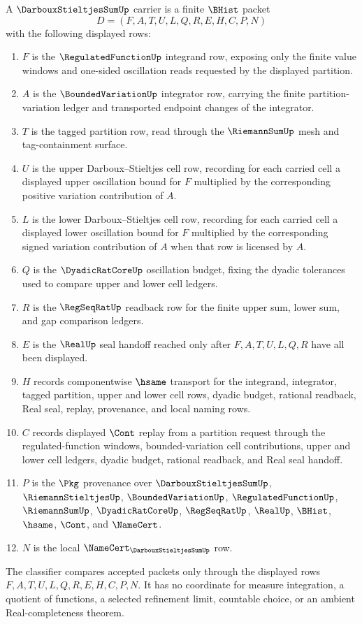 \begin{definition}
\label{def:darboux-stieltjes-sum-carrier}
A $\DarbouxStieltjesSumUp$ carrier is a finite $\BHist$ packet
$$
D=(F,A,T,U,L,Q,R,E,H,C,P,N)
$$
with the following displayed rows:
\begin{enumerate}
\item $F$ is the $\RegulatedFunctionUp$ integrand row, exposing only the finite value windows and one-sided oscillation reads requested by the displayed partition.
\item $A$ is the $\BoundedVariationUp$ integrator row, carrying the finite partition-variation ledger and transported endpoint changes of the integrator.
\item $T$ is the tagged partition row, read through the $\RiemannSumUp$ mesh and tag-containment surface.
\item $U$ is the upper Darboux--Stieltjes cell row, recording for each carried cell a displayed upper oscillation bound for $F$ multiplied by the corresponding positive variation contribution of $A$.
\item $L$ is the lower Darboux--Stieltjes cell row, recording for each carried cell a displayed lower oscillation bound for $F$ multiplied by the corresponding signed variation contribution of $A$ when that row is licensed by $A$.
\item $Q$ is the $\DyadicRatCoreUp$ oscillation budget, fixing the dyadic tolerances used to compare upper and lower cell ledgers.
\item $R$ is the $\RegSeqRatUp$ readback row for the finite upper sum, lower sum, and gap comparison ledgers.
\item $E$ is the $\RealUp$ seal handoff reached only after $F,A,T,U,L,Q,R$ have all been displayed.
\item $H$ records componentwise $\hsame$ transport for the integrand, integrator, tagged partition, upper and lower cell rows, dyadic budget, rational readback, Real seal, replay, provenance, and local naming rows.
\item $C$ records displayed $\Cont$ replay from a partition request through the regulated-function windows, bounded-variation cell contributions, upper and lower cell ledgers, dyadic budget, rational readback, and Real seal handoff.
\item $P$ is the $\Pkg$ provenance over $\DarbouxStieltjesSumUp$, $\RiemannStieltjesUp$, $\BoundedVariationUp$, $\RegulatedFunctionUp$, $\RiemannSumUp$, $\DyadicRatCoreUp$, $\RegSeqRatUp$, $\RealUp$, $\BHist$, $\hsame$, $\Cont$, and $\NameCert$.
\item $N$ is the local $\NameCert_{\DarbouxStieltjesSumUp}$ row.
\end{enumerate}
The classifier compares accepted packets only through the displayed rows $F,A,T,U,L,Q,R,E,H,C,P,N$. It has no coordinate for measure integration, a quotient of functions, a selected refinement limit, countable choice, or an ambient Real-completeness theorem.
\end{definition}

